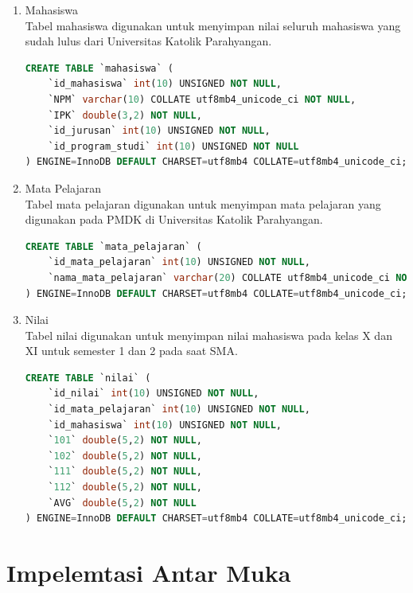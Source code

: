 \begin{enumerate}
    \item Mahasiswa\\
    Tabel mahasiswa digunakan untuk menyimpan nilai seluruh mahasiswa yang sudah lulus dari Universitas Katolik Parahyangan.
    
\begin{lstlisting}[language=SQL, caption=Implementasi tabel ]
CREATE TABLE `mahasiswa` (
    `id_mahasiswa` int(10) UNSIGNED NOT NULL,
    `NPM` varchar(10) COLLATE utf8mb4_unicode_ci NOT NULL,
    `IPK` double(3,2) NOT NULL,
    `id_jurusan` int(10) UNSIGNED NOT NULL,
    `id_program_studi` int(10) UNSIGNED NOT NULL
) ENGINE=InnoDB DEFAULT CHARSET=utf8mb4 COLLATE=utf8mb4_unicode_ci;    
\end{lstlisting}
    
    \item Mata Pelajaran\\
    Tabel mata pelajaran digunakan untuk menyimpan mata pelajaran yang digunakan pada PMDK di Universitas Katolik Parahyangan.
    
\begin{lstlisting}[language=SQL, caption=Implementasi tabel ]
CREATE TABLE `mata_pelajaran` (
    `id_mata_pelajaran` int(10) UNSIGNED NOT NULL,
    `nama_mata_pelajaran` varchar(20) COLLATE utf8mb4_unicode_ci NOT NULL
) ENGINE=InnoDB DEFAULT CHARSET=utf8mb4 COLLATE=utf8mb4_unicode_ci;
\end{lstlisting}
    
    \item Nilai\\
    Tabel nilai digunakan untuk menyimpan nilai mahasiswa pada kelas X dan XI untuk semester 1 dan 2 pada saat SMA.
    
\begin{lstlisting}[language=SQL, caption=Implementasi tabel ]
CREATE TABLE `nilai` (
    `id_nilai` int(10) UNSIGNED NOT NULL,
    `id_mata_pelajaran` int(10) UNSIGNED NOT NULL,
    `id_mahasiswa` int(10) UNSIGNED NOT NULL,
    `101` double(5,2) NOT NULL,
    `102` double(5,2) NOT NULL,
    `111` double(5,2) NOT NULL,
    `112` double(5,2) NOT NULL,
    `AVG` double(5,2) NOT NULL
) ENGINE=InnoDB DEFAULT CHARSET=utf8mb4 COLLATE=utf8mb4_unicode_ci;
\end{lstlisting}
    
\end{enumerate}

\section{Impelemtasi Antar Muka}
\label{sec:implementasi antar muka}

